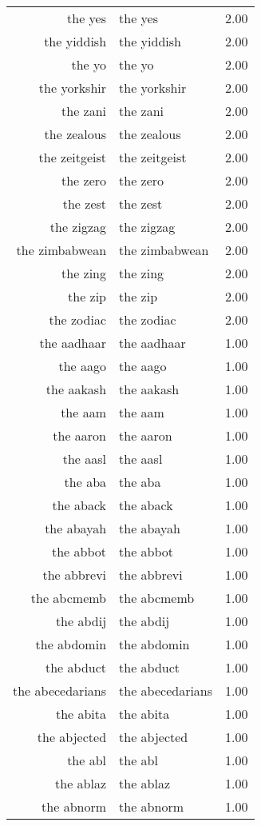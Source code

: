 \begin{table}[ht]
\begin{tabular}{rlr}
  the yes & the yes & 2.00 \\ 
  the yiddish & the yiddish & 2.00 \\ 
  the yo & the yo & 2.00 \\ 
  the yorkshir & the yorkshir & 2.00 \\ 
  the zani & the zani & 2.00 \\ 
  the zealous & the zealous & 2.00 \\ 
  the zeitgeist & the zeitgeist & 2.00 \\ 
  the zero & the zero & 2.00 \\ 
  the zest & the zest & 2.00 \\ 
  the zigzag & the zigzag & 2.00 \\ 
  the zimbabwean & the zimbabwean & 2.00 \\ 
  the zing & the zing & 2.00 \\ 
  the zip & the zip & 2.00 \\ 
  the zodiac & the zodiac & 2.00 \\ 
  the aadhaar & the aadhaar & 1.00 \\ 
  the aago & the aago & 1.00 \\ 
  the aakash & the aakash & 1.00 \\ 
  the aam & the aam & 1.00 \\ 
  the aaron & the aaron & 1.00 \\ 
  the aasl & the aasl & 1.00 \\ 
  the aba & the aba & 1.00 \\ 
  the aback & the aback & 1.00 \\ 
  the abayah & the abayah & 1.00 \\ 
  the abbot & the abbot & 1.00 \\ 
  the abbrevi & the abbrevi & 1.00 \\ 
  the abcmemb & the abcmemb & 1.00 \\ 
  the abdij & the abdij & 1.00 \\ 
  the abdomin & the abdomin & 1.00 \\ 
  the abduct & the abduct & 1.00 \\ 
  the abecedarians & the abecedarians & 1.00 \\ 
  the abita & the abita & 1.00 \\ 
  the abjected & the abjected & 1.00 \\ 
  the abl & the abl & 1.00 \\ 
  the ablaz & the ablaz & 1.00 \\ 
  the abnorm & the abnorm & 1.00 \\ 

\end{tabular}
\end{table}
